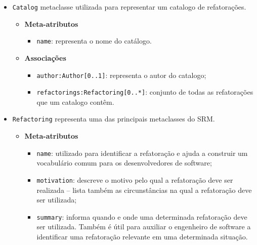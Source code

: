 \begin{itemize}
\item \texttt{Catalog} metaclasse utilizada para representar um catalogo de refatorações.

\begin{itemize}
	\item \textbf{Meta-atributos}
		\begin{itemize}
			\item \texttt{name}: representa o nome do catálogo. 
		\end{itemize}	
\end{itemize} 

\begin{itemize}
	\item \textbf{Associações}
		\begin{itemize}
			\item \texttt{author:Author[0..1]}: representa o autor do catalogo;
			\item \texttt{refactorings:Refactoring[0..*]}: conjunto de todas as refatorações que um catalogo contêm.
		\end{itemize}	
\end{itemize} 

\item \texttt{Refactoring} representa uma das principais metaclasses do SRM.

\begin{itemize}
	\item \textbf{Meta-atributos}
		\begin{itemize}
			\item \texttt{name}: utilizado para identificar a refatoração e ajuda a construir um vocabulário comum para os desenvolvedores de software;
			\item \texttt{motivation}: descreve o motivo pelo qual a refatoração deve ser realizada – lista também as circunstâncias na qual a refatoração deve ser utilizada;
			\item \texttt{summary}: informa quando e onde uma determinada refatoração deve ser utilizada. Também é útil para auxiliar o engenheiro de software a identificar uma refatoração relevante em uma determinada situação. 
		\end{itemize}	
\end{itemize} 


\end{itemize}
